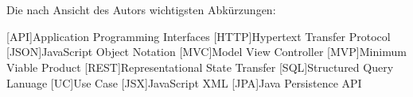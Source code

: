 \chapter*{\nameoflistofacronyms}

Die nach Ansicht des Autors wichtigsten Abkürzungen:
\bigskip

\begin{adjustwidth}{1.5em}{}
\begin{acronym}[AAAAA] %
	
	
	
	[API]{Application Programming Interfaces}
	[HTTP]{Hypertext Transfer Protocol}
	[JSON]{JavaScript Object Notation}
	[MVC]{Model View Controller}
	[MVP]{Minimum Viable Product}
	[REST]{Representational State Transfer}
	[SQL]{Structured Query Lanuage}
	[UC]{Use Case}
	[JSX]{JavaScript XML}
	[JPA]{Java Persistence API}

	
	
	
\end{acronym}	
\end{adjustwidth}

